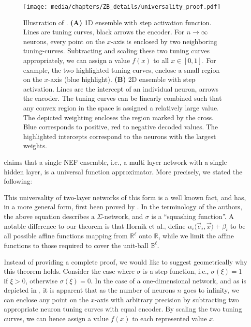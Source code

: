 \begin{figure}
	\centering
	\texttt{[image: media/chapters/ZB\_details/universality\_proof.pdf]}%
	{\label{fig:universality_proof_a}}%
	{\label{fig:universality_proof_b}}%
	\caption[Illustration of ]{Illustration of . \textbf{(A)} 1D ensemble with step activation function. Lines are tuning curves, black arrows the encoder. For $n \to \infty$ neurons, every point on the $x$-axis is enclosed by two neighboring tuning-curves. Subtracting and scaling these two tuning curves appropriately, we can assign a value $f(x)$ to all $x \in [0, 1]$.
	For example, the two highlighted tuning curves, enclose a small region on the $x$-axis (blue highlight).
	\textbf{(B)} 2D ensemble with step activation. Lines are the intercept of an individual neuron, arrows the encoder.
	The tuning curves can be linearly combined such that any convex region in the space is assigned a relatively large value.
	The depicted weighting encloses the region marked by the cross. Blue corresponds to positive, red to negative decoded values. The highlighted intercepts correspond to the neurons with the largest weights.}
\end{figure}

 claims that a single NEF ensemble, i.e., a multi-layer network with a single hidden layer, is a universal function approximator.
More precisely, we stated the following:

\ThmTwoLayerUniversal*

This universality of two-layer networks of this form is a well known fact, and has, in a more general form, first been proved by \citet{hornik1989multilayer}.
In the terminology of the authors, the above equation describes a $\Sigma$-network, and $\sigma$ is a \enquote{squashing function}.
A notable difference to our theorem is that Hornik et al., define $\alpha_i \langle \vec e_i, \vec x \rangle + \beta_i$ to be all possible affine functions mapping from $\mathbb{R}^\ell$ onto $\mathbb{R}$, while we limit the affine functions to those required to cover the unit-ball $\mathbb{B}^\ell$.

Instead of providing a complete proof, we would like to suggest geometrically why this theorem holds.
Consider the case where $\sigma$ is a step-function, i.e., $\sigma(\xi) = 1$ if $\xi > 0$, otherwise $\sigma(\xi) = 0$.
In the case of a one-dimensional network, and as is depicted in , it is apparent that as the number of neurons $n$ goes to infinity, we can enclose any point on the $x$-axis with arbitrary precision by subtracting two appropriate neuron tuning curves with equal encoder.
By scaling the two tuning curves, we can hence assign a value $f(x)$ to each represented value $x$.

